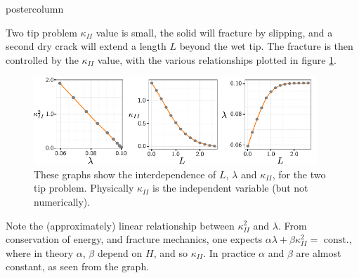 \documentclass{beamer}
\begin{document}
\begin{frame}
\begin{columns}
\begin{column}{.57\textwidth}
\begin{beamercolorbox}[center]{postercolumn}
\begin{minipage}{.98\textwidth}
{\begin{myblock}{Two tip problem}
$\kappa_{II}$ value is small, the solid will fracture by slipping,
and a second dry crack will extend a length $L$ beyond the wet tip. The fracture
is then controlled by the $\kappa_{II}$ value, with the various relationships
plotted in figure \ref{fig:KI0}.
\begin{figure}
\centering\includegraphics[width=0.95\textwidth]{KI-0-poster.pdf}
\caption{These graphs show the interdependence of $L$, $\lambda$ and 
         $\kappa_{II}$, for the two tip problem. Physically $\kappa_{II}$ is
         the independent variable (but not numerically).}\label{fig:KI0}
\end{figure}
Note the (approximately) linear relationship between 
$\kappa_{II}^2$ and $\lambda$. From conservation of energy, and fracture 
mechanics, one expects $\alpha \lambda + \beta
\kappa_{II}^2 = \mbox{ const.}$, where in theory $\alpha$, $\beta$ depend
on $H$, and so $\kappa_{II}$. In practice $\alpha$ and $\beta$ are almost
constant, as seen from the graph.
 

\end{myblock}}
\end{minipage}
\end{beamercolorbox}
\end{column}
\end{columns}
\end{frame}
\end{document}
